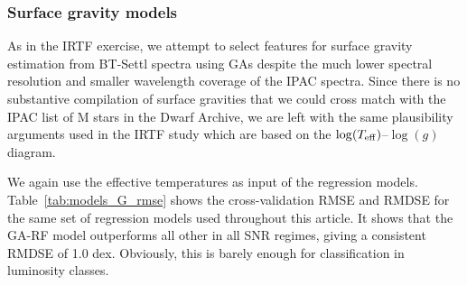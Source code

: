 \subsubsection{Surface gravity models}

As in the IRTF exercise, we attempt to select features for surface
gravity estimation from BT-Settl spectra using GAs despite the much
lower spectral resolution and smaller wavelength coverage of the IPAC
spectra. Since there is no substantive compilation of surface
gravities that we could cross match with the IPAC list of M stars in
the Dwarf Archive, we are left with the same plausibility arguments
used in the IRTF study which are based on the $\log(T_{\rm
  eff})$--$\log(g)$ diagram.

We again use the effective temperatures as input of the regression
models. Table~\ref{tab:models_G_rmse} shows the cross-validation RMSE
and RMDSE for the same set of regression models used throughout this
article. It shows that the GA-RF model outperforms all other in all
SNR regimes, giving a consistent RMDSE of 1.0 dex. Obviously, this is
barely enough for classification in luminosity classes.



